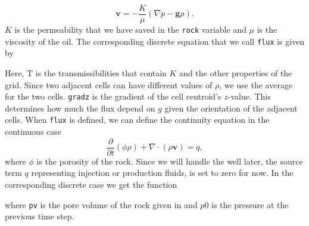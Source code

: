 \begin{equation}
    \textbf{v} = - \frac{K}{\mu}(\nabla p - \textbf{g}\rho).
    \label{eq:pressSolverDarcy}
\end{equation}
$K$ is the permeability that we have saved in the \texttt{rock} variable and $\mu$ is the viscosity of the oil.
The corresponding discrete equation that we call \texttt{flux} is given by 

Here, T is the transmissibilities that contain $K$ and the other properties of the grid. Since two adjacent cells can have different values of $\rho$, we use the  average for the two cells. \texttt{gradz} is the gradient of the cell centroid's $z$-value. This determines how much the flux depend on $g$ given the orientation of the adjacent cells. When \texttt{flux} is defined, we can define the continuity equation in the continuous case
\begin{equation}
    \frac{\partial}{\partial t}(\phi\rho) + \nabla\cdot(\rho\textbf{v}) = q,
    \label{eq:continuityEqPressure}
\end{equation}
where $\phi$ is the porosity of the rock. Since we will handle the well later, the source term $q$ representing injection or production fluids, is set to zero for now. In the corresponding discrete case we get the function

where \texttt{pv} is the pore volume of the rock given in  and $p0$ is the pressure at the previous time step. 

